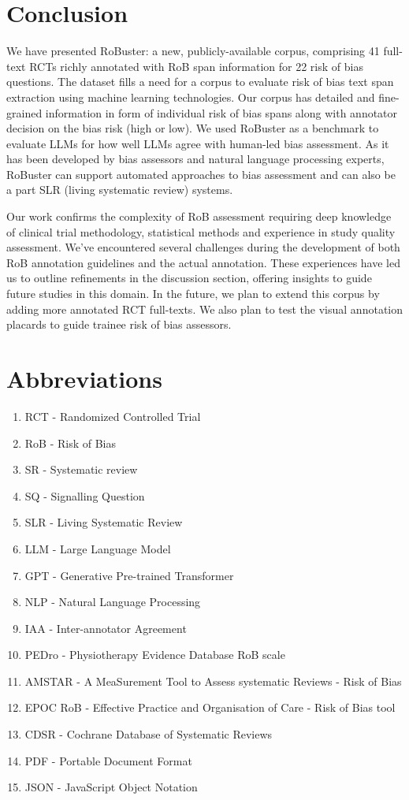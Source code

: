 \documentclass[sn-mathphys,Numbered]{sn-jnl}%
\theoremstyle{thmstyleone}%
\theoremstyle{thmstyletwo}%
\theoremstyle{thmstylethree}%
\begin{document}
\section{Conclusion}
\label{sec:conclusion}
%
We have presented RoBuster: a new, publicly-available corpus, comprising 41 full-text RCTs richly annotated with RoB span information for 22 risk of bias questions.
The dataset fills a need for a corpus to evaluate risk of bias text span extraction using machine learning technologies.
Our corpus has detailed and fine-grained information in form of individual risk of bias spans along with annotator decision on the bias risk (high or low).
We used RoBuster as a benchmark to evaluate LLMs for how well LLMs agree with human-led bias assessment.
As it has been developed by bias assessors and natural language processing experts, RoBuster can support automated approaches to bias assessment and can also be a part SLR (living systematic review) systems.


Our work confirms the complexity of RoB assessment requiring deep knowledge of clinical trial methodology, statistical methods and experience in study quality assessment.
We've encountered several challenges during the development of both RoB annotation guidelines and the actual annotation.
These experiences have led us to outline refinements in the discussion section, offering insights to guide future studies in this domain.
In the future, we plan to extend this corpus by adding more annotated RCT full-texts.
We also plan to test the visual annotation placards to guide trainee risk of bias assessors.
%
%
%
\section{Abbreviations}%
%
\begin{enumerate}
    \item RCT - Randomized Controlled Trial
    \item RoB - Risk of Bias
    \item SR - Systematic review
    \item SQ - Signalling Question
    \item SLR - Living Systematic Review
    \item LLM - Large Language Model
    \item GPT - Generative Pre-trained Transformer
    \item NLP - Natural Language Processing
    \item IAA - Inter-annotator Agreement
    \item PEDro - Physiotherapy Evidence Database RoB scale
    \item AMSTAR - A MeaSurement Tool to Assess systematic Reviews - Risk of Bias
    \item EPOC RoB - Effective Practice and Organisation of Care - Risk of Bias tool
    \item CDSR - Cochrane Database of Systematic Reviews
    \item PDF - Portable Document Format
    \item JSON - JavaScript Object Notation
\end{enumerate}
%
%
%
\backmatter
\end{document}
